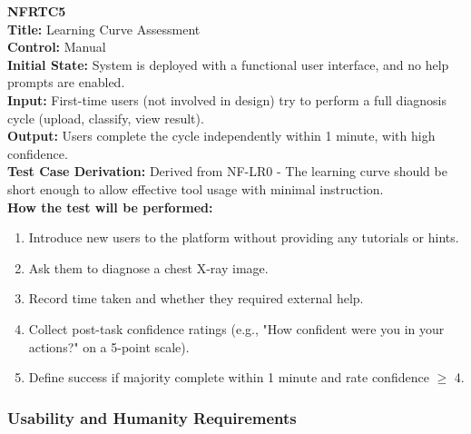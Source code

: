 \documentclass[12pt, titlepage]{article}
\begin{document}
\textbf{NFRTC5}\\
\textbf{Title:} Learning Curve Assessment\\
\textbf{Control:} Manual\\
\textbf{Initial State:} System is deployed with a functional user interface, and no help prompts are enabled.\\
\textbf{Input:} First-time users (not involved in design) try to perform a full diagnosis cycle (upload, classify, view result).\\
\textbf{Output:} Users complete the cycle independently within 1 minute, with high confidence.\\
\textbf{Test Case Derivation:} Derived from NF-LR0 - The learning curve should be short enough to allow effective tool usage with minimal instruction.\\
\textbf{How the test will be performed:}
\begin{enumerate}
  \item Introduce new users to the platform without providing any tutorials or hints.
  \item Ask them to diagnose a chest X-ray image.
  \item Record time taken and whether they required external help.
  \item Collect post-task confidence ratings (e.g., "How confident were you in your actions?" on a 5-point scale).
  \item Define success if majority complete within 1 minute and rate confidence $\geq$ 4.
\end{enumerate}

\vspace{1em}

\subsubsection{Usability and Humanity Requirements}
\end{document}
